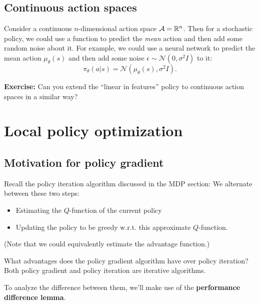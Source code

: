 \documentclass[\main/main]{subfiles}
\begin{document}
\subsection{Continuous action spaces}

Consider a continuous $n$-dimensional action space $\mathcal{A} = \mathbb{R}^n$. Then for a stochastic policy, we could use a function to predict the \emph{mean} action and then add some random noise about it. For example, we could use a neural network to predict the mean action $\mu_\theta(s)$ and then add some noise $\epsilon \sim \mathcal{N}(0, \sigma^2 I)$ to it: \[
    \pi_\theta(a|s) = \mathcal{N}(\mu_\theta(s), \sigma^2 I).
\]

\textbf{Exercise:} Can you extend the ``linear in features'' policy to continuous action spaces in a similar way?

\section{Local policy optimization}

\subsection{Motivation for policy gradient}

Recall the policy iteration algorithm discussed in the MDP section: We alternate between these two steps:

\begin{itemize}
    \item Estimating the $Q$-function of the current policy
    \item Updating the policy to be greedy w.r.t. this approximate $Q$-function.
\end{itemize}

(Note that we could equivalently estimate the advantage function.)

What advantages does the policy gradient algorithm have over policy iteration? Both policy gradient and policy iteration are iterative algorithms.

To analyze the difference between them, we'll make use of the \textbf{performance difference lemma}.
\end{document}
